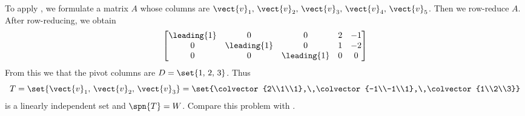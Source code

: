 To apply , we formulate a matrix $A$ whose columns are $\vect{v}_1,\,\vect{v}_2,\,\vect{v}_3,\,\vect{v}_4,\,\vect{v}_5$.  Then we row-reduce $A$.  After row-reducing, we obtain
%
\begin{equation*}
\begin{bmatrix}
\leading{1} & 0 & 0 & 2 & -1\\
0 & \leading{1} & 0 & 1 & -2\\
0 & 0 & \leading{1} & 0 & 0
\end{bmatrix}
\end{equation*}
%
From this we that the pivot columns are $D=\set{1,\,2,\,3}$.  Thus 
%
\begin{equation*}
T=\set{\vect{v}_1,\,\vect{v}_2,\,\vect{v}_3}=\set{\colvector{2\\1\\1},\,\colvector{-1\\-1\\1},\,\colvector{1\\2\\3}}
\end{equation*}
%
is a linearly independent set and $\spn{T}=W$.  Compare this problem with .

